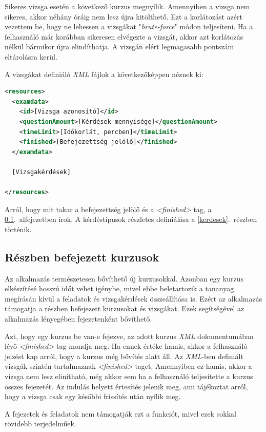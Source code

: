 \documentclass[12pt,a4paper]{article}
\newcommand{\xml}{\textit{XML}\xspace}
\begin{document}
	Sikeres vizsga esetén a következő kurzus megnyílik. Amennyiben a vizsga nem sikeres, akkor néhány óráig nem lesz újra kitölthető. Ezt a korlátozást azért vezettem be, hogy ne lehessen a vizsgákat "\textit{brute-force}" módon teljesíteni. Ha a felhasználó már korábban sikeresen elvégezte a vizsgát, akkor azt korlátozás nélkül bármikor újra elindíthatja. A vizsgán elért legmagasabb pontszám eltárolásra kerül.
	
	A vizsgákat definiáló \xml fájlok a következőképpen néznek ki:
	
	\bigskip
	\begin{lstlisting}[language=XML]
<resources>
  <examdata>
	<id>[Vizsga azonosító]</id>
	<questionAmount>[Kérdések mennyisége]</questionAmount>
	<timeLimit>[Időkorlát, percben]</timeLimit>
    <finished>[Befejezettség jelölő]</finished>
  </examdata>
  
  [Vizsgakérdések]
  
</resources>
	\end{lstlisting}

	Arról, hogy mit takar a befejezettség jelölő és a \textit{<finished>} tag, a \ref{reszben_befejezett_kurzusok}.\ alfejezetben írok. A kérdéstípusok részletes definiálása a \ref{kerdesek}.\ részben történik.
	
	\subsection{Részben befejezett kurzusok}\label{reszben_befejezett_kurzusok}
	
	Az alkalmazás természetesen bővíthető új kurzusokkal. Azonban egy kurzus elkészítésé hosszú időt vehet igénybe, mivel ebbe beletartozik a tananyag megírásán kívül a feladatok és vizsgakérdések összeállítása is. Ezért az alkalmazás támogatja a részben befejezett kurzusokat és vizsgákat. Ezek segítségével az alkalmazás lényegében fejezetenként bővíthető.
	
	Azt, hogy egy kurzus be van-e fejezve, az adott kurzus \xml dokumentumában lévő \textit{<finished>} tag mondja meg. Ha ennek értéke hamis, akkor a felhasználó jelzést kap arról, hogy a kurzus még bővítés alatt áll. Az \xml-ben definiált vizsgák szintén tartalmaznak  \textit{<finished>} taget. Amennyiben ez hamis, akkor a vizsga nem lesz elinítható, még akkor sem ha a felhasználó teljesítette a kurzus összes fejezetét. Az indulás helyett értesítés jelenik meg, ami tájékoztat arról, hogy a vizsga csak egy későbbi frissítés után nyílik meg.
	
	A fejezetek és feladatok nem támogatják ezt a funkciót, mivel ezek sokkal rövidebb terjedelműek.
	
\end{document}
